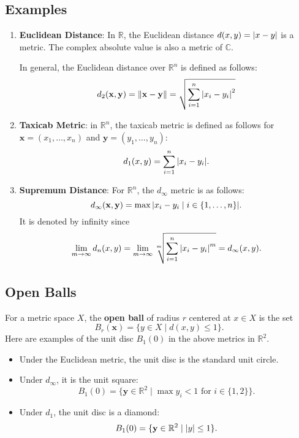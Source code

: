 \documentclass[11pt]{article}
\renewcommand{\vec}[1]{\mathbf{#1}}
\begin{document}

\subsection{Examples}

\begin{enumerate}
	\item \textbf{Euclidean Distance}: In $\mathbb{R}$, the Euclidean distance $d(x, y) = \abs{x - y}$ is a metric. The complex absolute value is also a metric of $\mathbb{C}$.

	In general, the Euclidean distance over $\mathbb{R}^{n}$ is defined as follows: 
	\[
		d_{2}(\vec{x}, \vec{y}) = \norm{\vec{x} - \vec{y}} = \sqrt{\sum\limits_{i = 1}^{n} \abs{x_{i} - y_{i}}^{2}}
	\]
	\item \textbf{Taxicab Metric}: in $\mathbb{R}^{n}$, the taxicab metric is defined as follows for $\vec{x} = (x_{1}, \ldots, x_{n})$ and $\vec{y} = (y_{1}, \ldots, y_{n})$:
	\[
		d_{1}(x, y) = \sum\limits_{i = 1}^{n} \abs{x_{i} - y_{i}}.
	\]
	\item \textbf{Supremum Distance}: For $\mathbb{R}^{n}$, the $d_{\infty}$ metric is as follows:
	\[
		d_{\infty}(\vec{x}, \vec{y}) = \max \abs{x_{i} - y_{i} \mid i \in \{ 1, \ldots, n \}}.
	\]
	It is denoted by infinity since
	\[
		\lim\limits_{m \to \infty} d_{n}(x, y) = \lim\limits_{m \to \infty} \sqrt[m]{\sum\limits_{i = 1}^{n} \abs{x_{i} - y_{i}}^{m}} = d_{\infty}(x, y).
	\]
\end{enumerate}

\subsection{Open Balls}

For a metric space $X$, the \textbf{open ball} of radius $r$ centered at $x \in X$ is the set
\[
	B_{r}(\vec{x}) = \{ y \in X \mid d(x, y) \le 1 \}.
\]
Here are examples of the unit disc $B_{1}(0)$ in the above metrics in $\mathbb{R}^{2}$.
\begin{itemize}
	\item Under the Euclidean metric, the unit disc is the standard unit circle.
	\item Under $d_{\infty}$, it is the unit square:
	\[
		B_{1}(0) = \{ \vec{y} \in \mathbb{R}^{2} \mid \max{y_{i}} < 1 \text{ for } i \in \{ 1, 2 \} \}.
	\]
	\item Under $d_{1}$, the unit disc is a diamond:
	\[
		B_{1}(0) = \{ \vec{y} \in \mathbb{R}^{2} \mid \abs{y} \le 1 \}.
	\]
\end{itemize}
\end{document}
